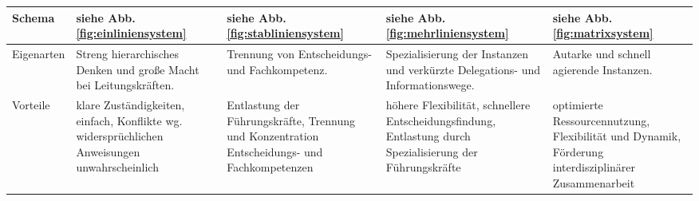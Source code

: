 \begin{table}[H]
\begin{tabularx}{\textwidth}{|>{\raggedright\arraybackslash}l|>{\raggedright\arraybackslash}X|>{\raggedright\arraybackslash}X|>{\raggedright\arraybackslash}X|>{\raggedright\arraybackslash}X|}
        \hline
        Schema     & siehe Abb. \ref{fig:einliniensystem}                                                                                                                     & siehe Abb. \ref{fig:stabliniensystem}                                                                                             & siehe Abb. \ref{fig:mehrliniensystem}                                                                                                                                                                                                                     & siehe Abb. \ref{fig:matrixsystem}                                                                                                                                                                                                                                   \\
        \hline
        Eigenarten & Streng hierarchisches Denken und große Macht bei Leitungskräften.                                                                                        & Trennung von Entscheidungs- und Fachkompetenz.                                                                                    & Spezialisierung der Instanzen und verkürzte Delegations- und Informationswege.                                                                                                                                                                            & Autarke und schnell agierende Instanzen.                                                                                                                                                                                                                            \\
        \hline
        Vorteile   & klare Zuständigkeiten, einfach, Konflikte wg. widersprüchlichen Anweisungen unwahrscheinlich                                                             & Entlastung der Führungskräfte, Trennung und Konzentration Entscheidungs- und Fachkompetenzen                                      & höhere Flexibilität, schnellere Entscheidungsfindung, Entlastung durch Spezialisierung der Führungskräfte                                                                                                                                                 & optimierte Ressourcennutzung, Flexibilität und Dynamik, Förderung interdisziplinärer Zusammenarbeit                                                                                                                                                                 \\

\end{tabularx}
\end{table}
